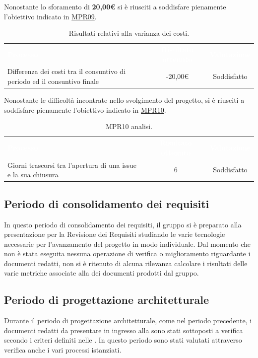Nonostante lo sforamento di \textbf{20,00€} si è riusciti a soddisfare pienamente l'obiettivo indicato in \hyperlink{MPR09}{MPR09}.
\begin{table} [H]
	\begin{center}
		\begin{tabular}{|C{6cm}|c|c|}
			\textcolor{white}{\textbf{Processo}}&
			\textcolor{white}{\textbf{Risultato ottenuto}}&
			\textcolor{white}{\textbf{Valutazione}}\\
			Differenza dei costi tra il consuntivo di periodo ed il consuntivo finale & -20,00€ & Soddisfatto\\ \hline
		\end{tabular}
	\end{center}
	\caption{\label{tab:MPR09Analisi}Risultati relativi alla varianza dei costi.}
\end{table}\noindent
Nonostante le difficoltà incontrate nello svolgimento del progetto, si è riusciti a soddisfare pienamente l'obiettivo indicato in \hyperlink{MPR10}{MPR10}.
\begin{table} [H]
	\begin{center}
		\begin{tabular}{|C{6cm}|c|c|}
			\textcolor{white}{\textbf{Processo}}&
			\textcolor{white}{\textbf{Risultato ottenuto}}&
			\textcolor{white}{\textbf{Valutazione}}\\
			Giorni trascorsi tra l'apertura di una issue e la sua chiusura & 6 & Soddisfatto\\ \hline
		\end{tabular}
	\end{center}
	\caption{\label{tab:MPR10Analisi}MPR10 analisi.}
\end{table}

\subsection{Periodo di consolidamento dei requisiti}
In questo periodo di consolidamento dei requisiti, il gruppo {\Gruppo} si è preparato alla presentazione per la Revisione dei Requisiti studiando le varie tecnologie necessarie per l'avanzamento del progetto in modo individuale. Dal momento che non è stata eseguita nessuna operazione di verifica o miglioramento riguardante i documenti redatti, non si è ritenuto di alcuna rilevanza calcolare i risultati delle varie metriche associate alla  dei documenti prodotti dal gruppo.
 
\subsection{Periodo di progettazione architetturale} \label{ResocontoPArchitetturale}
Durante il periodo di progettazione architetturale, come nel periodo precedente, i documenti redatti da presentare in ingresso alla  sono stati sottoposti a verifica secondo i criteri definiti nelle . In questo periodo sono stati valutati attraverso verifica anche i vari processi istanziati.
